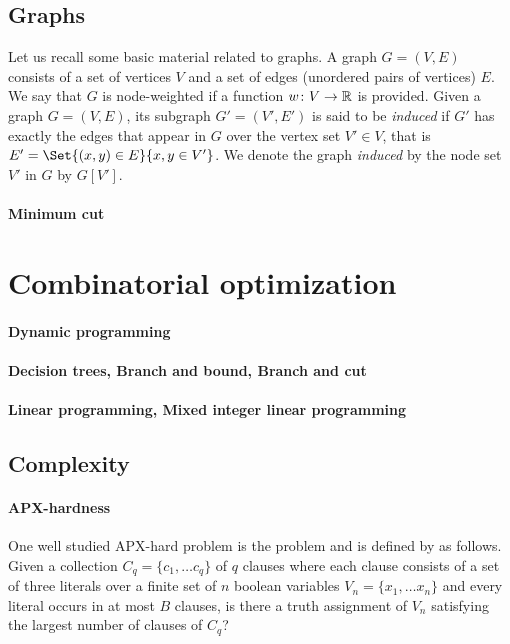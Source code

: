 	\subsection{Graphs}
		Let us recall some basic material related to graphs.
		A graph $G = (V,E)$ consists of a set of vertices $V$ and a set of edges (unordered pairs of vertices) $E$.
		We say that $G$ is node-weighted if a function $w\colon V \to \mathbb{R}$ is provided.
		Given a graph $G = (V, E)$, its subgraph $G' = (V', E')$ is said to be \emph{induced} if $G'$ has exactly the edges that appear in $G$ over the vertex set $V' \in V$, that is $E' = \Set{(x, y) \in E}{x,y \in V'}$.
		We  denote the graph \emph{induced} by the node set $V'$ in $G$ by $G\left[V'\right]$.

		\paragraph{Minimum cut}

\section{Combinatorial optimization}
	\paragraph{Dynamic programming}
	\paragraph{Decision trees, Branch and bound, Branch and cut}
	\paragraph{Linear programming, Mixed integer linear programming}

	\subsection{Complexity}
		\paragraph{APX-hardness}
			\label{par:m3sat}
			One well studied APX-hard problem is the \msat{} problem and is defined by \textcite{papadimitriou1991optimization} as follows.
			Given a collection $C_q = \{c_1, \ldots c_q\}$ of $q$ clauses where each clause consists of a set of three literals over a finite set of $n$ boolean variables $V_n = \{x_1, \ldots x_n\}$ and every literal occurs in at most $B$ clauses, is there a truth assignment of $V_n$ satisfying the largest number of clauses of $C_q$?

